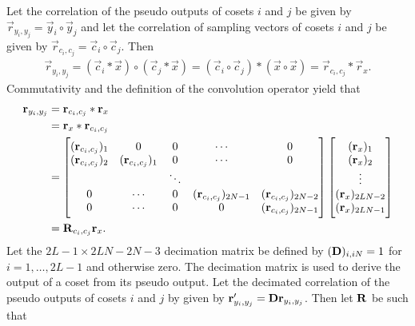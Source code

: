 \documentclass[a4paper, openany, oneside]{memoir}
\begin{document}
Let the correlation of the pseudo outputs of cosets $i$ and $j$ be given by $\vec{r}_{y_i,y_j} = \vec{y}_i \circ \vec{y}_j$ and let the correlation of sampling vectors of cosets $i$ and $j$ be given by $\vec{r}_{c_i,c_j} = \vec{c}_i \circ \vec{c}_j$. Then
\begin{align*}
    \vec{r}_{y_i,y_j} =(\vec{c}_i \ast \vec{x}) \circ (\vec{c}_j \ast \vec{x}) = (\vec{c}_i \circ \vec{c}_j) \ast (\vec{x} \circ \vec{x}) = \vec{r}_{c_i,c_j} \ast \vec{r}_x.
\end{align*}
Commutativity and the definition of the convolution operator yield that
\begin{align*}
    \boldsymbol{\mathbf{r}}_{y_i,y_j}
    &= \boldsymbol{\mathbf{r}}_{c_i,c_j} \ast \boldsymbol{\mathbf{r}}_x\\
    &= \boldsymbol{\mathbf{r}}_x \ast \boldsymbol{\mathbf{r}}_{c_i,c_j} \\
    &=
    \begin{bmatrix}
        (\boldsymbol{\mathbf{r}}_{c_i,c_j})_1 & 0 & 0& \cdots & 0 \\
        (\boldsymbol{\mathbf{r}}_{c_i,c_j})_2 & (\boldsymbol{\mathbf{r}}_{c_i,c_j})_1 & 0 & \cdots & 0 \\
        &  & \ddots &  & \\
        0 &  \cdots & 0 & (\boldsymbol{\mathbf{r}}_{c_i,c_j})_{2N-1} & (\boldsymbol{\mathbf{r}}_{c_i,c_j})_{2N-2} \\
        0 &  \cdots & 0& 0 & (\boldsymbol{\mathbf{r}}_{c_i,c_j})_{2N - 1} \\
    \end{bmatrix}
    \begin{bmatrix}
        (\boldsymbol{\mathbf{r}}_x)_1 \\
        (\boldsymbol{\mathbf{r}}_x)_2 \\
        \vdots \\
        (\boldsymbol{\mathbf{r}}_x)_{2LN-2} \\
        (\boldsymbol{\mathbf{r}}_x)_{2LN-1}
    \end{bmatrix}\\
    &= \boldsymbol{\mathbf{R}}_{c_i,c_j} \boldsymbol{\mathbf{r}}_x.
\end{align*}
Let the $2L-1\times 2LN-2N-3$ decimation matrix be defined by $(\boldsymbol{\mathbf{D}})_{i,iN} = 1$ for $i=1,\ldots,2L-1$ and otherwise zero. The decimation matrix is used to derive the output of a coset from its pseudo output. Let the decimated correlation of the pseudo outputs of cosets $i$ and $j$ by given by $\boldsymbol{\mathbf{r}}'_{y_i,y_j} = \boldsymbol{\mathbf{D}} \boldsymbol{\mathbf{r}}_{y_i,y_j}$. Then let $\boldsymbol{\mathbf{R}}$ be such that
\end{document}
